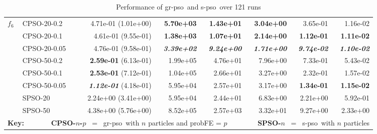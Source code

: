 \documentclass[a4paper,twoside]{article}
\newcommand{\spso}{{\sc s-pso}}
\newcommand{\cfe}{{\sc gr-pso}}
\begin{document}
\begin{table}
\begin{tabular}{|| l | l | r | r | r | r | r | r ||}
$f_6$   &  CPSO-20-0.2    & 4.71e-01 (1.01e+00)                &  {\bf 5.70e+03}         &  {\bf 1.43e+01}         &  {\bf 3.04e+00}         &  3.65e-01               &  1.16e-02 \\
    \cline{2-8}  
        &  CPSO-20-0.1    & 4.61e-01 (9.55e-01)                &  {\bf 1.38e+03}         &  {\bf 1.07e+01}         &  {\bf 2.14e+00}         &  {\bf 1.12e-01}         &  {\bf 1.11e-02} \\
    \cline{2-8}
        &  CPSO-20-0.05   & 4.76e-01 (9.58e-01)                &  {\bf \emph{3.39e+02}}  &  {\bf \emph{9.24e+00}}  &  {\bf \emph{1.71e+00}}  &  {\bf \emph{9.74e-02}}  &  {\bf \emph{1.10e-02}} \\
    \cline{2-8}
        &  CPSO-50-0.2    & {\bf 2.59e-01}  (6.13e-01)         &  1.99e+05               &  4.76e+01               &  7.96e+00               &  7.33e-01               &  5.43e-02 \\
    \cline{2-8}
        &  CPSO-50-0.1    & {\bf 2.53e-01}  (7.12e-01)         &  1.04e+05               &  2.66e+01               &  3.27e+00               &  2.32e-01               &  1.57e-02 \\
    \cline{2-8}
        &  CPSO-50-0.05   & {\bf \emph{1.12e-01}} (4.18e-01)   &  5.95e+04               &  2.57e+01               &  3.17e+00               &  {\bf 1.34e-01}         &  {\bf 1.15e-02} \\
\hline \hline
        &  SPSO-20        & 2.24e+00 (3.41e+00)                &  5.95e+04               &  2.44e+01               &  6.83e+00               &  2.21e+00               &  5.92e-01 \\
    \cline{2-8}
        &  SPSO-50        & 4.38e+00 (5.76e+00)                &  8.52e+05               &  2.57e+03               &  3.32e+01               &  9.27e+00               &  2.33e+00 \\

\hline \hline \hline


\multicolumn{8}{c}{{\bf Key:} \ \ \ \ \ \ \ {\bf CPSO-$n$-$p$} \ = \ \cfe\ with $n$ particles and probFE = $p$ \ \ \ \ \ \ \ \ {\bf SPSO-$n$} \ = \ \spso\ with $n$ particles}  \\


\end{tabular}
\caption{Performance of \cfe\ and \spso\ over 121 runs }
\label{t:gbest-data}
\end{table}
\end{document}
